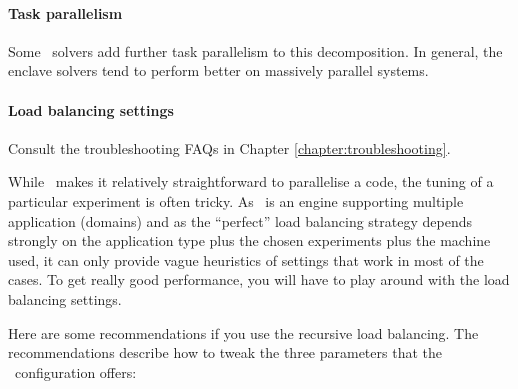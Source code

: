 \paragraph{Task parallelism}

Some \ExaHyPE\ solvers add further task parallelism to this decomposition. 
In general, the enclave solvers tend to perform better on massively parallel
systems.



\paragraph{Load balancing settings}

\begin{remark}
 Consult the troubleshooting FAQs in Chapter \ref{chapter:troubleshooting}.
\end{remark}

\noindent
While \ExaHyPE\ makes it relatively straightforward to parallelise a code, 
the tuning of a particular experiment is often tricky.
As \ExaHyPE\ is an engine supporting multiple application (domains) and as the
``perfect'' load balancing strategy depends strongly on the application type
plus the chosen experiments plus the machine used, it can only provide vague
heuristics of settings that work in most of the cases. 
To get really good performance, you will have to play around with the load
balancing settings.


Here are some recommendations if you use the recursive load balancing.
The recommendations describe how to tweak the three parameters that the
\ExaHyPE\ configuration offers:


